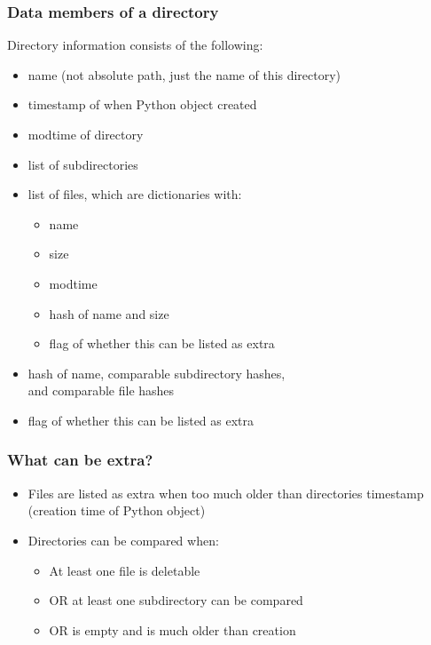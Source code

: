 \documentclass{beamer}
\begin{document}
\begin{frame}
  \frametitle{Data members of a directory}

  Directory information consists of the following:
  \begin{itemize}
  \item name (not absolute path, just the name of this directory)
  \item timestamp of when Python object created
  \item modtime of directory
  \item list of subdirectories
  \item list of files, which are dictionaries with:
    \begin{itemize}
    \item name
    \item size
    \item modtime
    \item hash of name and size
    \item flag of whether this can be listed as extra
    \end{itemize}
  \item hash of name, comparable subdirectory hashes, \\
    and comparable file hashes
  \item flag of whether this can be listed as extra
  \end{itemize}

\end{frame}

\begin{frame}
  \frametitle{What can be extra?}

  \begin{itemize}
  \item Files are listed as extra when too much older than directories timestamp \\
    (creation time of Python object)
  \item Directories can be compared when:
    \begin{itemize}
    \item At least one file is deletable
    \item OR at least one subdirectory can be compared
    \item OR is empty and is much older than creation
    \end{itemize}
  \end{itemize}

\end{frame}
\end{document}
